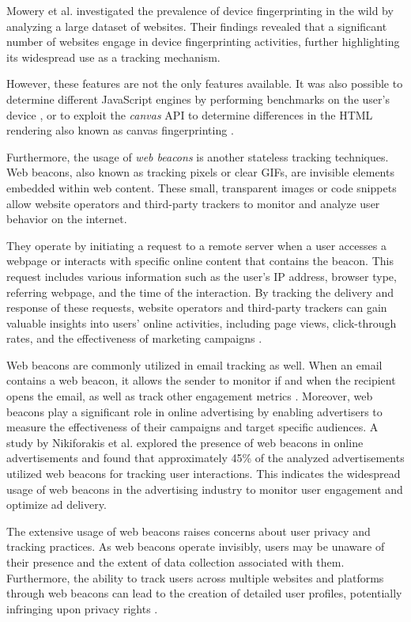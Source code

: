 Mowery et al. \cite{mowery2011fingerprinting} investigated the prevalence of device fingerprinting
in the wild by analyzing a large dataset of websites. Their findings revealed that a significant
number of websites engage in device fingerprinting activities, further highlighting its widespread
use as a tracking mechanism.

However, these features are not the only features available. It was also possible to determine different JavaScript engines by 
performing benchmarks on the user's device \cite{miyazaki2008online}, or to exploit the \emph{canvas} API to determine differences 
in the HTML rendering also known as canvas fingerprinting \cite{mowery2012pixel}.

Furthermore, the usage of \emph{web beacons} is another stateless tracking techniques.
Web beacons, also known as tracking pixels or clear GIFs, are invisible elements embedded within web content.
These small, transparent images or code snippets allow website operators and third-party trackers to monitor
and analyze user behavior on the internet.

They operate by initiating a request to a remote server when a user accesses a webpage
or interacts with specific online content that contains the beacon. This request includes various
information such as the user's IP address, browser type, referring webpage, and the time of
the interaction. By tracking the delivery and response of these requests, website operators
and third-party trackers can gain valuable insights into users' online activities,
including page views, click-through rates, and the effectiveness of marketing campaigns \cite{zimmer2010but}.

Web beacons are commonly utilized in email tracking as well. When an email contains a web beacon, it allows the sender to monitor
if and when the recipient opens the email, as well as track other engagement metrics \cite{gurses2011engineering}. 
Moreover, web beacons play a significant role in online advertising by enabling advertisers to measure the effectiveness
of their campaigns and target specific audiences. A study by Nikiforakis et al. \cite{nikiforakis2013cookieless}
explored the presence of web beacons in online advertisements and found that approximately 45\% of the analyzed advertisements
utilized web beacons for tracking user interactions. This indicates the widespread usage of web beacons in the advertising
industry to monitor user engagement and optimize ad delivery.

The extensive usage of web beacons raises concerns about user privacy and tracking practices. As web beacons operate invisibly,
users may be unaware of their presence and the extent of data collection associated with them. Furthermore, the ability to track
users across multiple websites and platforms through web beacons can lead to the creation of detailed user profiles,
potentially infringing upon privacy rights \cite{acquisti2015privacy}.

